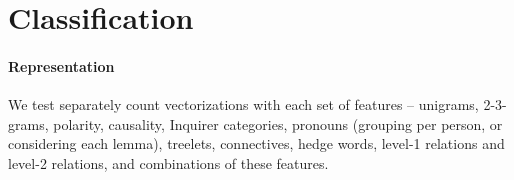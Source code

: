 \documentclass[11pt,letterpaper]{article}
\begin{document}
\begin{table}[t!]
%
\caption{Size of the original vocabulary and number of selected features for $n$-grams and treelets.}
\label{table:vocab}
\end{table}



\section{Classification}
\label{sec:expe}


\paragraph{Representation}

We test separately count vectorizations with each set of features -- unigrams, 2-3-grams, polarity, causality, Inquirer categories, pronouns (grouping per person, or considering each lemma), treelets, connectives, hedge words, level-1 relations and level-2 relations, and combinations of these features.
\end{document}
